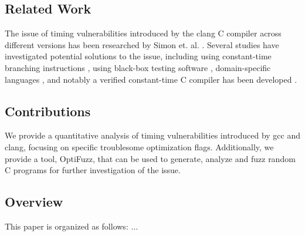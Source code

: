 \subsection{Related Work}
The issue of timing vulnerabilities introduced by the clang C compiler across different versions has been researched by Simon et. al. \citep{what-you-c}. 
Several studies have investigated potential solutions to the issue, including using constant-time branching instructions \citep{what-you-c}, using black-box testing software \citep{dudect}, domain-specific languages \citep{fact}, and notably a verified constant-time C compiler has been developed \citep{verified-constant-time-c-comiler}.

\subsection{Contributions}
We provide a quantitative analysis of timing vulnerabilities introduced by gcc and clang, focusing on specific troublesome optimization flags.
Additionally, we provide a tool, OptiFuzz, that can be used to generate, analyze and fuzz random C programs for further investigation of the issue.
\subsection{Overview}
This paper is organized as follows: $\ldots$ 
